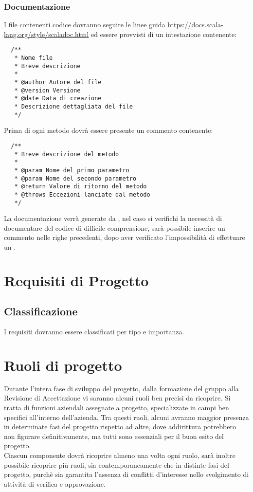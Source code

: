 \documentclass{scalatekids-article}
\begin{document}
\subsubsection{Documentazione}
I file contenenti codice dovranno seguire le linee guida 
\url{https://docs.scala-lang.org/style/scaladoc.html} ed essere provvisti di un
intestazione contenente:
\begin{lstlisting}
  /**
   * Nome file
   * Breve descrizione
   *
   * @author Autore del file
   * @version Versione
   * @date Data di creazione
   * Descrizione dettagliata del file
   */
\end{lstlisting}
Prima di ogni metodo dovrà essere presente un commento  contenente:
\begin{lstlisting}
  /**
   * Breve descrizione del metodo
   *
   * @param Nome del primo parametro
   * @param Nome del secondo parametro
   * @return Valore di ritorno del metodo
   * @throws Eccezioni lanciate dal metodo
   */
\end{lstlisting}
La documentazione verrà generate da , nel caso si verifichi la
necessità di documentare del codice di difficile comprensione, sarà possibile
inserire un commento nelle righe precedenti, dopo aver verificato
l'impossibilità di effettuare un .

\section{Requisiti di Progetto}
\subsection{Classificazione}
I requisiti dovranno essere classificati per tipo e importanza.

\section{Ruoli di progetto}
Durante l'intera fase di sviluppo del progetto, dalla formazione del gruppo alla
Revisione di Accettazione vi saranno alcuni ruoli ben precisi da ricoprire. Si
tratta di funzioni aziendali assegnate a progetto, specializzate in campi ben
specifici all'interno dell'azienda. Tra questi ruoli, alcuni avranno maggior
presenza in determinate fasi del progetto rispetto ad altre, dove addirittura
potrebbero non figurare definitivamente, ma tutti sono essenziali per il buon
esito del progetto.\\ Ciascun componente dovrà ricoprire almeno una volta ogni
ruolo, sarà inoltre possibile ricoprire più ruoli, sia contemporaneamente che in
distinte fasi del progetto, purchè sia garantita l'assenza di conflitti
d'interesse nello svolgimento di attività di verifica e approvazione.
\end{document}
